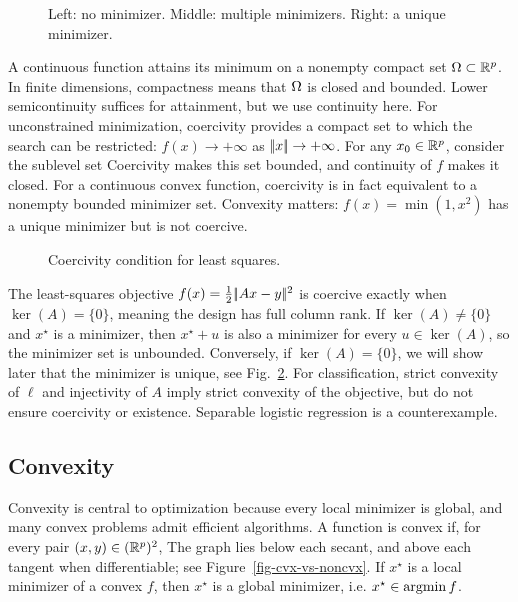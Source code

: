\begin{figure}[tbp]
\centering
{}
\caption{Left: no minimizer. Middle: multiple minimizers. Right: a unique minimizer.}
\label{fig-minimizer-exists}
\end{figure}

A continuous function attains its minimum on a nonempty compact set $\Omega\subset\mathbb{R}^p$. In finite dimensions, compactness means that $\Omega$ is closed and bounded. Lower semicontinuity suffices for attainment, but we use continuity here. For unconstrained minimization, coercivity provides a compact set to which the search can be restricted: $f(x) \rightarrow +\infty$ as $|\!| x |\!|\rightarrow+\infty$. For any $x_0 \in \mathbb{R}^p$, consider the sublevel set
Coercivity makes this set bounded, and continuity of $f$ makes it closed. For a continuous convex function, coercivity is in fact equivalent to a nonempty bounded minimizer set. Convexity matters: $f(x)=\min(1,x^2)$ has a unique minimizer but is not coercive.

\begin{figure}[tbp]
\centering
{}\hfill
{}
\caption{Coercivity condition for least squares.}
\label{fig-least-square}
\end{figure}

\begin{exmp}
The least-squares objective $f(x)=\frac{1}{2}|\!| Ax-y |\!|^2$ is coercive exactly when $\ker(A)=\{0\}$, meaning the design has full column rank. If $\ker(A) \neq \{0\}$ and $x^\star$ is a minimizer, then $x^\star+u$ is also a minimizer for every $u \in \ker(A)$, so the minimizer set is unbounded.
%
Conversely, if $\ker(A) = \{0\}$, we will show later that the minimizer is unique, see Fig.~\ref{fig-least-square}.
%
For classification, strict convexity of $\ell$ and injectivity of $A$ imply strict convexity of the objective, but do not ensure coercivity or existence. Separable logistic regression is a counterexample.
\end{exmp}

\subsection{Convexity}

Convexity is central to optimization because every local minimizer is global, and many convex problems admit efficient algorithms. A function is convex if, for every pair $(x,y) \in (\mathbb{R}^p)^2$,
The graph lies below each secant, and above each tangent when differentiable; see Figure~\ref{fig-cvx-vs-noncvx}.
%
If $x^\star$ is a local minimizer of a convex $f$, then $x^\star$ is a global minimizer, i.e. $x^\star \in \operatorname{argmin} f$.  


